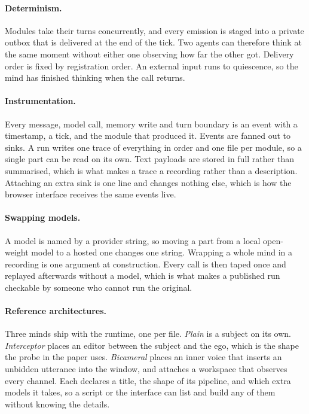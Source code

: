 \documentclass[11pt,letterpaper]{article}
\begin{document}
\paragraph{Determinism.} Modules take their turns concurrently, and every
emission is staged into a private outbox that is delivered at the end of the
tick. Two agents can therefore think at the same moment without either one
observing how far the other got. Delivery order is fixed by registration order.
An external input runs to quiescence, so the mind has finished thinking when
the call returns.

\paragraph{Instrumentation.} Every message, model call, memory write and turn
boundary is an event with a timestamp, a tick, and the module that produced it.
Events are fanned out to sinks. A run writes one trace of everything in order
and one file per module, so a single part can be read on its own. Text payloads
are stored in full rather than summarised, which is what makes a trace a
recording rather than a description. Attaching an extra sink is one line and
changes nothing else, which is how the browser interface receives the same
events live.

\paragraph{Swapping models.} A model is named by a provider string, so moving a
part from a local open-weight model to a hosted one changes one string.
Wrapping a whole mind in a recording is one argument at construction. Every
call is then taped once and replayed afterwards without a model, which is what
makes a published run checkable by someone who cannot run the original.

\paragraph{Reference architectures.} Three minds ship with the runtime, one per
file. \emph{Plain} is a subject on its own. \emph{Interceptor} places an editor
between the subject and the ego, which is the shape the probe in the paper
uses. \emph{Bicameral} places an inner voice that inserts an unbidden utterance
into the window, and attaches a workspace that observes every channel. Each
declares a title, the shape of its pipeline, and which extra models it takes,
so a script or the interface can list and build any of them without knowing the
details.
\end{document}
